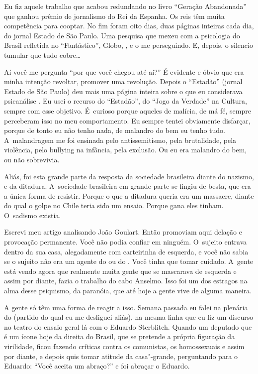 Eu fiz aquele trabalho que acabou redundando no livro ``Geração
Abandonada'' que ganhou prêmio de jornalismo do Rei da Espanha. Os reis
têm muita competência para cooptar. No fim foram oito dias, duas páginas
inteiras cada dia, do jornal Estado de São Paulo. Uma pesquisa que mexeu
com a psicologia do Brasil refletida no ``Fantástico'',  Globo, ,
e o  me perseguindo. E, depois, o silencio tumular que tudo
cobre…

 

Aí você me pergunta ``por que você chegou até aí?'' É evidente e óbvio
que era minha intenção revoltar, promover uma revolução. Depois o
``Estadão'' (jornal Estado de São Paulo) deu mais uma página inteira
sobre o que eu considerava psicanálise . Eu usei o recurso do
``Estadão'', do ``Jogo da Verdade'' na  Cultura, sempre com esse
objetivo. É~curioso porque aqueles de malícia, de má fé, sempre
perceberam isso no meu comportamento. Eu sempre tentei obviamente
disfarçar, porque de tonto eu não tenho nada, de malandro do bem eu
tenho tudo. A~malandragem me foi ensinada pelo antissemitismo, pela
brutalidade, pela violência, pelo bullying na infância, pela exclusão.
Ou eu era malandro do bem, ou não sobrevivia.

 

Aliás, foi esta grande parte da resposta da sociedade brasileira diante
do nazismo, e da ditadura. A~sociedade brasileira em grande parte se
fingiu de besta, que era a única forma de resistir. Porque o que a
ditadura queria era um massacre, diante do qual o golpe no Chile teria
sido um ensaio. Porque gana eles tinham. O~sadismo existia.

 

Escrevi meu artigo analisando João Goulart. Então promoviam aqui delação
e provocação permanente. Você não podia confiar em ninguém. O~sujeito
entrava dentro da sua casa, alegadamente com carteirinha de esquerda, e
você não sabia se o sujeito não era um agente do  ou do . Você
tinha que tomar cuidado. A~gente está vendo agora que realmente muita
gente que se mascarava de esquerda e assim por diante, fazia o trabalho
do cabo Anselmo. Isso foi um dos estragos na alma desse psiquismo, da
paranóia, que até hoje a gente vive de alguma maneira.

 

A gente só têm uma forma de reagir a isso. Semana passada eu falei na
plenária do  (partido do qual eu me desliguei aliás), na mesma linha
que eu fiz um discurso no teatro do ensaio geral lá com o Eduardo
Sterblitch. Quando um deputado que é um ícone hoje da direita do Brasil,
que se pretende a própria figuração da virilidade, ficou fazendo
críticas contra os comunistas, os homossexuais e assim por diante, e
depois quis tomar atitude da casa"-grande, perguntando para o Eduardo:
``Você aceita um abraço?'' e foi abraçar o Eduardo.

